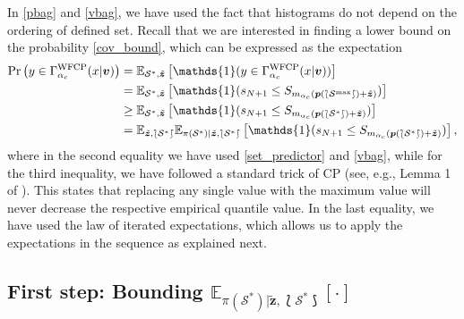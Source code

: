 \documentclass[12pt, draftclsnofoot, onecolumn]{IEEEtran}
\begin{document}
In \eqref{pbag} and \eqref{vbag}, we have used the fact that histograms do not depend on the ordering of defined set. Recall that we are interested in finding a lower bound on the probability \eqref{cov_bound}, which can be expressed as the expectation
\begin{align}\label{int}
    \Pr\left(y \in \Gamma_{\alpha_c}^{\text{\rm{WFCP}}}(x|\boldsymbol{v})\right)&=\mathbb{E}_{\mathcal{S}^*,\tilde{\boldsymbol{z}}}\left[\mathds{1}(y \in \Gamma_{\alpha_c}^{\text{\rm{WFCP}}}(x|\boldsymbol{v}))\right]\nonumber\\
    &=\mathbb{E}_{\mathcal{S}^*,\tilde{\boldsymbol{z}}}\left[\mathds{1}(s_{N+1}\leq S_{m_{\alpha_c}(\boldsymbol{p}(\lbag\mathcal{S}^{\text{max}}\rbag)+\tilde{\boldsymbol{z}})})\right]\nonumber\\
    &\geq\mathbb{E}_{\mathcal{S}^*,\tilde{\boldsymbol{z}}}\left[\mathds{1}(s_{N+1}\leq S_{m_{\alpha_c}(\boldsymbol{p}(\lbag\mathcal{S}^*\rbag)+\tilde{\boldsymbol{z}})})\right]\nonumber\\
    &=\mathbb{E}_{\tilde{\boldsymbol{z}},\lbag \mathcal{S}^* \rbag}\mathbb{E}_{\pi(\mathcal{S}^*)|\tilde{\boldsymbol{z}},\lbag \mathcal{S}^* \rbag}\left[\mathds{1}(s_{N+1}\leq S_{m_{\alpha_c}(\boldsymbol{p}(\lbag\mathcal{S}^*\rbag)+\tilde{\boldsymbol{z}})})\right],
\end{align}
where in the second equality we have used \eqref{set_predictor} and \eqref{vbag}, while for the third inequality, we have followed a standard trick of CP (see, e.g., Lemma 1 of \cite{tibshirani2019conformal}). This states that replacing any single value with the maximum value will never decrease the respective empirical quantile value. In the last equality, we have used the law of iterated expectations, which allows us to apply the expectations in the sequence as explained next.

\subsection*{\textbf{First step: Bounding $\mathbb{E}_{\pi(\mathcal{S}^*)|\tilde{\boldsymbol{z}},\lbag \mathcal{S}^* \rbag}[\cdot]$}}
\end{document}
